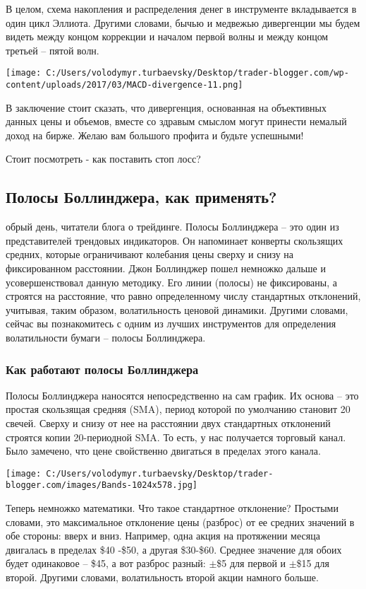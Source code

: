 \documentclass[a5paper]{article}
\begin{document}
В целом, схема накопления и распределения денег в инструменте
вкладывается в один цикл Эллиота. Другими словами, бычью и медвежью
дивергенции мы будем видеть между концом коррекции и началом первой
волны и между концом третьей – пятой волн.

\texttt{[image: C:/Users/volodymyr.turbaevsky/Desktop/trader-blogger.com/wp-content/uploads/2017/03/MACD-divergence-11.png]}

В заключение стоит сказать, что дивергенция, основанная на объективных данных цены и объемов, вместе со здравым смыслом могут принести немалый доход на бирже. Желаю вам большого профита и будьте успешными!


Стоит посмотреть - как поставить стоп лосс?

\subsection{Полосы Боллинджера, как применять?}

обрый день, читатели блога о трейдинге. Полосы Боллинджера – это один из представителей трендовых индикаторов. Он напоминает конверты скользящих средних, которые ограничивают колебания цены сверху и снизу на фиксированном расстоянии. Джон Боллинджер пошел немножко дальше и усовершенствовал данную методику. Его линии (полосы) не фиксированы, а строятся на расстояние, что равно определенному числу стандартных отклонений, учитывая, таким образом, волатильность ценовой динамики. Другими словами, сейчас вы познакомитесь с одним из лучших инструментов для определения волатильности бумаги – полосы Боллинджера.

\subsubsection{Как работают полосы Боллинджера}

Полосы Боллинджера наносятся непосредственно на сам график. Их основа
– это простая скользящая средняя (SMA), период которой по умолчанию
становит 20 свечей. Сверху и снизу от нее на расстоянии двух
стандартных отклонений строятся копии 20-периодной SMA. То есть, у нас
получается торговый канал. Было замечено, что цене свойственно
двигаться в пределах этого канала.

\texttt{[image: C:/Users/volodymyr.turbaevsky/Desktop/trader-blogger.com/images/Bands-1024x578.jpg]}

Теперь немножко математики. Что такое стандартное отклонение? Простыми словами, это максимальное отклонение цены (разброс) от ее средних значений в обе стороны: вверх и вниз. Например, одна акция на протяжении месяца двигалась в пределах \$40 -\$50, а другая \$30-\$60. Среднее значение для обоих будет одинаковое – \$45, а вот разброс разный: $\pm$\$5 для первой и $\pm$\$15 для второй. Другими словами, волатильность второй акции намного больше.
\end{document}
